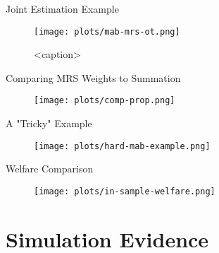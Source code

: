 \documentclass[aspectratio=169,xcolor=dvipsnames]{beamer}
\begin{document}
\begin{frame}{Joint Estimation Example}

    \begin{figure}[htbp]
        \centering
        \texttt{[image: plots/mab-mrs-ot.png]} 
        \caption{<caption>}
        \label{<label>}
    \end{figure}

\end{frame}



\begin{frame}{Comparing MRS Weights to Summation}

   \begin{figure}[htbp]
       \centering
       \texttt{[image: plots/comp-prop.png]} 
   \end{figure} 

\end{frame}


\begin{frame}{A "Tricky" Example}
    \begin{figure}[htbp]
        \centering
        \texttt{[image: plots/hard-mab-example.png]} 
    \end{figure}
\end{frame}

\begin{frame}{Welfare Comparison}

    \begin{figure}[htbp]
        \centering
       \texttt{[image: plots/in-sample-welfare.png]} 
    \end{figure}
    

\end{frame}

\section{Simulation Evidence}
\end{document}
